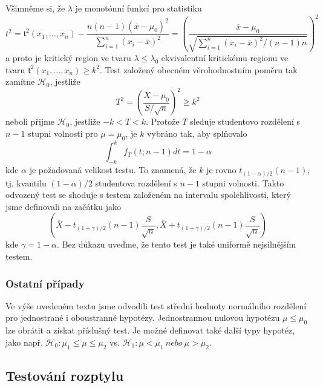 Všimněme si, že $\lambda$ je monotónní funkcí pro statistiku
\begin{equation*}
t^2 = \mathfrak{t}^2(x_1, ..., x_n) - \frac{n(n - 1)(\overline{x} - \mu_0)^2}{\sum_{i = 1}^n (x_i - \overline{x})^2} = \left(\frac{\overline{x} - \mu_0}{\sqrt{\sum_{i = 1}^n (x_i - \overline{x})^2 / (n-1)n}}\right)^2
\end{equation*}
a proto je kritický region ve tvaru $\lambda \le \lambda_0$ ekvivalentní kritickému regionu ve tvaru $\mathfrak{t}^2(x_1, ..., x_n) \ge k^2$. Test založený obecném věrohodnostním poměru tak zamítne $\mathscr{H}_0$, jestliže
\begin{equation*}
T^2 = \left(\frac{\overline{X} - \mu_0}{S / \sqrt{n}}\right)^2 \ge k^2
\end{equation*}
neboli přijme $\mathscr{H}_0$, jestliže $-k < T < k$. Protože $T$ sleduje studentovo rozdělení s $n - 1$ stupni volnosti pro $\mu = \mu_0$, je $k$ vybráno tak, aby splňovalo
\begin{equation*}
\int_{-k}^k f_T(t; n-1)dt = 1 - \alpha
\end{equation*}
kde $\alpha$ je požadovaná velikost testu. To znamená, že $k$ je rovno $t_{(1 - \alpha)/2}(n - 1)$, tj. kvantilu $(1 - \alpha)/2$ studentova rozdělení s $n - 1$ stupni volnosti. Takto odvozený test se shoduje s testem založeném na intervalu spolehlivosti, který jsme definovali na začátku jako
\begin{equation*}
\left(\overline{X} - t_{(1 + \gamma) / 2}(n - 1)\frac{S}{\sqrt{n}}, \overline{X} + t_{(1 + \gamma)/2}(n - 1)\frac{S}{\sqrt{n}}\right)
\end{equation*}
kde $\gamma = 1 - \alpha$. Bez důkazu uveďme, že tento test je také uniformě nejsilnějším testem.

\subsubsection{Ostatní případy}

Ve výše uvedeném textu jsme odvodili test střední hodnoty normálního rozdělení pro jednostrané i oboustranné hypotézy. Jednostrannou nulovou hypotézu $\mu \le \mu_0$ lze obrátit a získat příslušný test. Je možné definovat také další typy hypotéz, jako např. $\mathscr{H}_0: \mu_1 \le \mu \le \mu_2$ vs. $\mathscr{H}_1: \mu < \mu_1 ~ \textit{nebo} ~ \mu > \mu_2$.

\subsection{Testování rozptylu}

